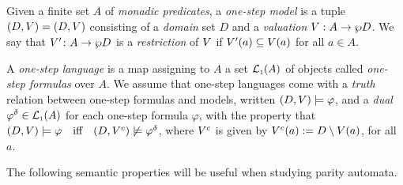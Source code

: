 \begin{definition}\label{def:one-step}
Given a finite set $A$ of \emph{monadic predicates}, a \emph{one-step model} is a tuple $(D, V) = (D,V)$
consisting of a \emph{domain} set $D$ and a \emph{valuation} $V : A \to \wp D$. We say that $V' \colon A \to \wp D$ is a \emph{restriction} of $V$ if $V'(a) \subseteq V(a)$ for all $a\in A$.


A \emph{one-step language} is a map assigning to $A$ a set $\mathcal{L}_{\scriptscriptstyle 1}(A)$ of objects called \emph{one-step formulas} over $A$. We assume that one-step languages come with a \emph{truth} relation between one-step formulas and models, written $(D, V) \models \varphi$, and a \emph{dual} $\varphi^{\delta} \in \mathcal{L}_{\scriptscriptstyle 1}(A)$ for each one-step formula $\varphi$, with the property that $(D,\val) \models \varphi\quad \text{iff}\quad (D,\val^{c}) \not\models \varphi^{\delta}$, where $V^{c}$ is given by $V^{c}(a) \mathrel{:=} D \setminus V(a)$, for all $a$.
\end{definition}

The following semantic properties will be useful when studying parity automata.

